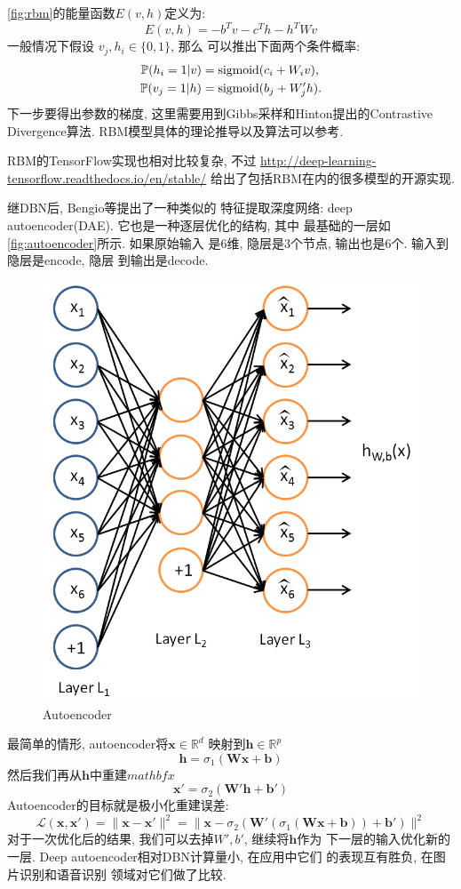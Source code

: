 \documentclass{ctexart}
\begin{document}
\autoref{fig:rbm}的能量函数\(E(v,h)\)定义为:
\[
  E(v,h) = - b^Tv - c^Th - h^TWv
\]
一般情况下假设 \(v_j, h_i \in \{0,1\}\), 那么
可以推出下面两个条件概率:
\begin{align*}
  \mathbb{P}(h_i=1|v)& = \operatorname*{sigmoid}(c_i + W_i v), \\
  \mathbb{P}(v_j=1|h)& = \operatorname*{sigmoid}(b_j + W'_j h).
\end{align*}
下一步要得出参数的梯度, 这里需要用到Gibbs采样和Hinton提出的Contrastive
Divergence算法.
RBM模型具体的理论推导以及算法可以参考\cite{fischer2012introduction}.

RBM的TensorFlow实现也相对比较复杂, 不过
\url{http://deep-learning-tensorflow.readthedocs.io/en/stable/}
给出了包括RBM在内的很多模型的开源实现.

继DBN后, Bengio等\cite{bengio2007greedy}提出了一种类似的
特征提取深度网络: deep autoencoder(DAE). 它也是一种逐层优化的结构, 其中
最基础的一层如\autoref{fig:autoencoder}所示. 如果原始输入
是6维, 隐层是3个节点, 输出也是6个. 输入到隐层是encode, 隐层
到输出是decode.
\begin{figure}[htb]
  \centering
  \includegraphics[width=.8\textwidth]{autoencoder}
  \caption{Autoencoder}
  \label{fig:autoencoder}
\end{figure}

最简单的情形, autoencoder将\( \mathbf{x} \in \mathbb{R}^d\)
映射到\(\mathbf{h} \in \mathbb{R}^p\)
\[
  \mathbf{h} = \sigma_1(\mathbf{Wx}+\mathbf{b})
\]
然后我们再从\(\mathbf{h}\)中重建\(mathbf{x}\)
\[
  \mathbf{x'} = \sigma_2(\mathbf{W'h}+\mathbf{b'})
\]
Autoencoder的目标就是极小化重建误差:
\[
  \mathcal{L}(\mathbf{x},\mathbf{x'})=
  \|\mathbf{x}-\mathbf{x'}\|^2=
  \|\mathbf{x}-\sigma_2(\mathbf{W'}(\sigma_1(\mathbf{Wx}+\mathbf{b}))+\mathbf{b'})\|^2
\]
对于一次优化后的结果, 我们可以去掉\(W', b'\), 继续将\(\mathbf{h}\)作为
下一层的输入优化新的一层. Deep autoencoder相对DBN计算量小, 在应用中它们
的表现互有胜负, \cite{cho2013boltzmann,deng2010binary}在图片识别和语音识别
领域对它们做了比较.
\end{document}

